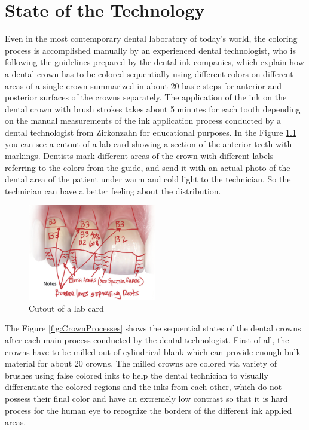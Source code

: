 \chapter{State of the Technology}
\label{sec:stand_technik}
Even in the most contemporary dental laboratory of today's world, the coloring process is accomplished manually by an experienced dental technologist, who is following the guidelines prepared by the dental ink companies, which explain how a dental crown has to be colored sequentially using different colors on different areas of a single crown summarized in about 20 basic steps for anterior and posterior surfaces of the crowns separately\citep{idscad2016}. The application of the ink on the dental crown with brush strokes takes about 5 minutes for each tooth depending on the manual measurements of the ink application process conducted by a dental technologist from Zirkonzahn for educational purposes.
In the Figure \ref{fig:lab_card} you can see a cutout of a lab card showing a section of the anterior teeth with markings. Dentists mark different areas of the crown with different labels referring to the colors from the guide, and send it  with an actual photo of the dental area of the patient under warm and cold light to the technician. So the technician can have a better feeling about the distribution.
\newline
\begin{figure}[h]
	\centering
	\includegraphics[width=0.5\textwidth]{grafiken/lab_card.png}
			\caption{Cutout of a lab card \citep{sharpling2014}}
	\label{fig:lab_card}
\end{figure}
\newline
The Figure \ref{fig:CrownProcesses} shows the sequential states of the dental crowns after each main process conducted by the dental technologist. First of all, the crowns have to be milled out of cylindrical blank which can provide enough bulk material for about 20 crowns. The milled crowns are colored via variety of brushes using  false colored inks to help the dental technician to visually differentiate the colored regions and the inks from each other, which do not possess their final color and have an extremely low contrast so that it is hard process for the human eye to recognize the borders of the different ink applied areas.


